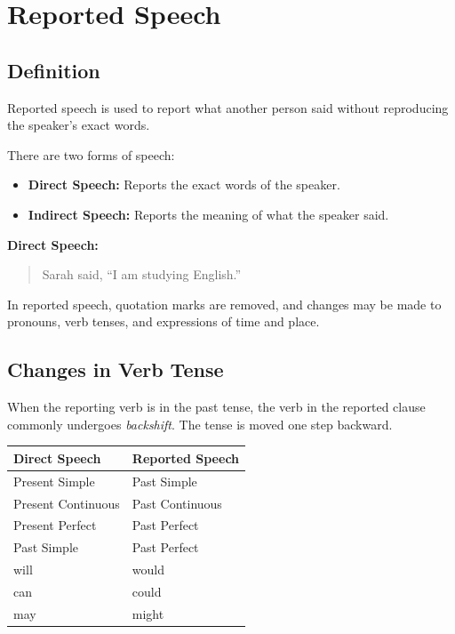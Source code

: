 \section{Reported Speech}

\subsection{Definition}

Reported speech is used to report what another person said without reproducing the speaker's exact words.

There are two forms of speech:

\begin{itemize}
\item \textbf{Direct Speech: }Reports the exact words of the speaker.
\item \textbf{Indirect Speech: }Reports the meaning of what the speaker said.
\end{itemize}

\textbf{Direct Speech:}
\begin{quotation}
  Sarah said, ``I am studying English.''
\end{quotation}

In reported speech, quotation marks are removed, and changes may be made to
pronouns, verb tenses, and expressions of time and place.


\subsection{Changes in Verb Tense}

When the reporting verb is in the past tense, the verb in the reported clause
commonly undergoes \textit{backshift}. The tense is moved one step backward.

\begin{center}
\begin{tabular}{ll}
\textbf{Direct Speech} & \textbf{Reported Speech} \\ \hline
Present Simple & Past Simple \\
Present Continuous & Past Continuous \\
Present Perfect & Past Perfect \\
Past Simple & Past Perfect \\
will & would \\
can & could \\
may & might
\end{tabular}
\end{center}


